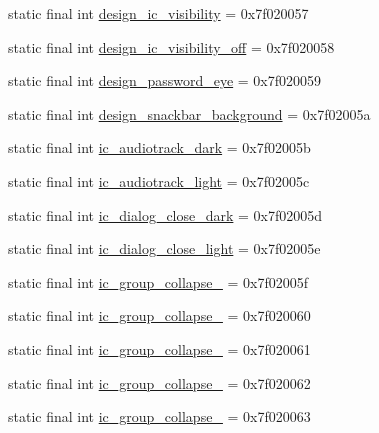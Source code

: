 \begin{CompactItemize}
\item 
static final int \hyperlink{classandroid_1_1support_1_1v7_1_1cardview_1_1_r_1_1drawable_7f0308c8e7d7557d3c1cf458e098797c}{design\_\-ic\_\-visibility} = 0x7f020057
\item 
static final int \hyperlink{classandroid_1_1support_1_1v7_1_1cardview_1_1_r_1_1drawable_b479cd2ab6ba186e39d7032342e10040}{design\_\-ic\_\-visibility\_\-off} = 0x7f020058
\item 
static final int \hyperlink{classandroid_1_1support_1_1v7_1_1cardview_1_1_r_1_1drawable_2af67c45c6a8486317ac67601a452103}{design\_\-password\_\-eye} = 0x7f020059
\item 
static final int \hyperlink{classandroid_1_1support_1_1v7_1_1cardview_1_1_r_1_1drawable_4099a2921ba5ab9caa5ee4c18240031f}{design\_\-snackbar\_\-background} = 0x7f02005a
\item 
static final int \hyperlink{classandroid_1_1support_1_1v7_1_1cardview_1_1_r_1_1drawable_3802d11d6fe4c1ecd50cd289a262f0a3}{ic\_\-audiotrack\_\-dark} = 0x7f02005b
\item 
static final int \hyperlink{classandroid_1_1support_1_1v7_1_1cardview_1_1_r_1_1drawable_113ad583fbf5b2662981f6b5d576e5d9}{ic\_\-audiotrack\_\-light} = 0x7f02005c
\item 
static final int \hyperlink{classandroid_1_1support_1_1v7_1_1cardview_1_1_r_1_1drawable_8adc554cfeec0e123e537272b42d7497}{ic\_\-dialog\_\-close\_\-dark} = 0x7f02005d
\item 
static final int \hyperlink{classandroid_1_1support_1_1v7_1_1cardview_1_1_r_1_1drawable_4ebdd948f399b1d5afc88e7c213092eb}{ic\_\-dialog\_\-close\_\-light} = 0x7f02005e
\item 
static final int \hyperlink{classandroid_1_1support_1_1v7_1_1cardview_1_1_r_1_1drawable_c8527d127635d2d8ce54ffe304a5eb0d}{ic\_\-group\_\-collapse\_} = 0x7f02005f
\item 
static final int \hyperlink{classandroid_1_1support_1_1v7_1_1cardview_1_1_r_1_1drawable_a85cd159e030fe3e4fa6a63f5059d064}{ic\_\-group\_\-collapse\_} = 0x7f020060
\item 
static final int \hyperlink{classandroid_1_1support_1_1v7_1_1cardview_1_1_r_1_1drawable_e6f02824de130e9f98c002471b7bb0a1}{ic\_\-group\_\-collapse\_} = 0x7f020061
\item 
static final int \hyperlink{classandroid_1_1support_1_1v7_1_1cardview_1_1_r_1_1drawable_ddfd484df09874bc1bbd576ceec4fe41}{ic\_\-group\_\-collapse\_} = 0x7f020062
\item 
static final int \hyperlink{classandroid_1_1support_1_1v7_1_1cardview_1_1_r_1_1drawable_80cf41f87d13bae69df43e35f84ab885}{ic\_\-group\_\-collapse\_} = 0x7f020063

\end{CompactItemize}
